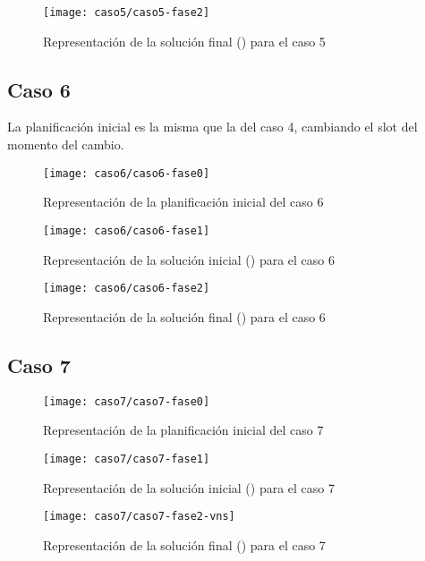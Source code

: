 \begin{figure}[!h]
	\centering
	\texttt{[image: caso5/caso5-fase2]}
	\caption{Representación de la solución final (\fasedos{}) para el caso 5}
	\label{fig:caso5-fase2}
\end{figure}

\FloatBarrier
\newpage
\subsection{Caso 6}

La planificación inicial es la misma que la del caso 4, cambiando el slot del momento del cambio.

\begin{figure}[!h]
	\centering
	\texttt{[image: caso6/caso6-fase0]}
	\caption{Representación de la planificación inicial del caso 6}
	\label{fig:caso6-fase0}
\end{figure}

\begin{figure}[!h]
	\centering
	\texttt{[image: caso6/caso6-fase1]}
	\caption{Representación de la solución inicial (\faseuno{}) para el caso 6}
	\label{fig:caso6-fase1}
\end{figure}

\begin{figure}[!h]
	\centering
	\texttt{[image: caso6/caso6-fase2]}
	\caption{Representación de la solución final (\fasedos{}) para el caso 6}
	\label{fig:caso6-fase2}
\end{figure}

\FloatBarrier
\newpage
\subsection{Caso 7}

\begin{figure}[!h]
	\centering
	\texttt{[image: caso7/caso7-fase0]}
	\caption{Representación de la planificación inicial del caso 7}
	\label{fig:caso7-fase0}
\end{figure}

\begin{figure}[!h]
	\centering
	\texttt{[image: caso7/caso7-fase1]}
	\caption{Representación de la solución inicial (\faseuno{}) para el caso 7}
	\label{fig:caso7-fase1}
\end{figure}

\begin{figure}[!h]
	\centering
	\texttt{[image: caso7/caso7-fase2-vns]}
	\caption{Representación de la solución final (\fasedos{}) para el caso 7}
	\label{fig:caso7-fase2}
\end{figure}

